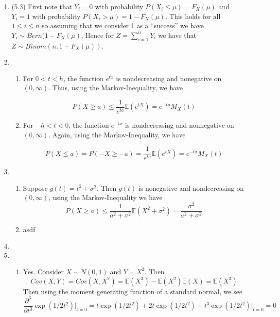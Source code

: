 \documentclass[12pt]{article}  %
\newcommand{\E}{{\mathbb{E}}}
\begin{document}
\begin{enumerate}
\item (5.3) First note that $Y_i = 0 $ with probability $P(X_i\leq \mu) = F_{X}(\mu)$ and $Y_i = 1$ with probability $P(X_i>\mu) = 1 - F_{X}(\mu)$. This holds for all $1\leq i\leq n$ so assuming that we consider 1 as a ``success'' we have $Y_i\sim Bern(1-F_X(\mu)$. Hence for $Z = \sum_{i=1}^{n}Y_i$ we have that $Z \sim Binom(n, 1-F_X(\mu))$. 

\item 
\begin{enumerate}

\item For $0<t<h$, the function $e^{tx}$ is nondecreasing and nonegative on $(0,\infty)$. Thus, using the Markov-Inequality, we have 

$$P(X\geq a) \leq \frac{1}{e^{ta}}\E(e^{tX}) = e^{-ta}M_X(t)$$

\item For $-h<t<0$, the function $e^{-tx}$ is nondecreasing and nonnegative on $(0,\infty)$. Again, using the Markov-Inequality, we have 

$$P(X\leq a) = P(-X\geq -a) = \frac{1}{e^{ta}}\E(e^{tX}) = e^{-ta}M_X(t)$$

\end{enumerate} 

\item 
\begin{enumerate}

\item Suppose $g(t) = t^2 + \sigma^2$. Then $g(t)$ is nonegative and nondecreasing on $(0,\infty)$, using the Markov-Inequality we have $$P(X\geq a)\leq \frac{1}{a^2 + \sigma^2}\E(X^2 +\sigma^2) = \frac{\sigma^2}{a^2 + \sigma^2}$$

\item asdf

\end{enumerate}

\item 

\item 
\begin{enumerate}

\item Yes. Consider $X\sim N(0,1)$ and $Y = X^2$. Then $$Cov(X,Y) = Cov(X,X^2) = \E(X^3) - \E(X^2)\E(X) = \E(X^3)$$ Then using the moment generating function of a standard normal, we see $$\frac{\partial^3}{\partial t^3}\exp(1/2t^2)\Big\vert_{t=0} = t\exp(1/2t^2) + 2t\exp(1/2t^2) + t^3\exp(1/2t^2)\Big\vert_{t=0} = 0$$


\end{enumerate}
\end{enumerate}
\end{document}
